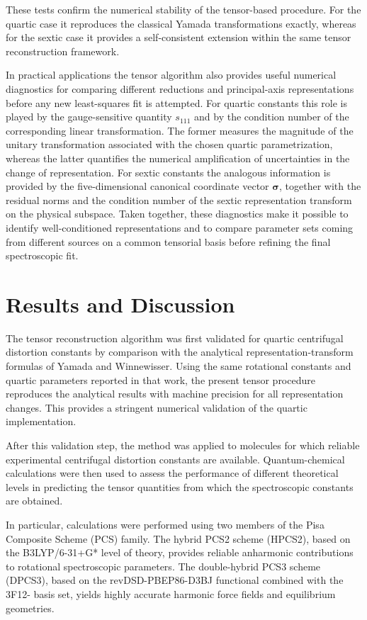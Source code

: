 These tests confirm the numerical stability of the tensor-based procedure.
For the quartic case it reproduces the classical Yamada transformations exactly,
whereas for the sextic case it provides a self-consistent extension within the
same tensor reconstruction framework.

In practical applications the tensor algorithm also provides useful numerical
diagnostics for comparing different reductions and principal-axis
representations before any new least-squares fit is attempted.  For quartic
constants this role is played by the gauge-sensitive quantity $s_{111}$ and by
the condition number of the corresponding linear transformation.  The former
measures the magnitude of the unitary transformation associated with the chosen
quartic parametrization, whereas the latter quantifies the numerical
amplification of uncertainties in the change of representation.  For sextic
constants the analogous information is provided by the five-dimensional
canonical coordinate vector $\boldsymbol\sigma$, together with the residual
norms and the condition number of the sextic representation transform on the
physical subspace.  Taken together, these diagnostics make it possible to
identify well-conditioned representations and to compare parameter sets coming
from different sources on a common tensorial basis before refining the final
spectroscopic fit.

\section{Results and Discussion}

The tensor reconstruction algorithm was first validated for quartic centrifugal
distortion constants by comparison with the analytical
representation-transform formulas of Yamada and
Winnewisser.\cite{Yamada1976} Using the same rotational constants and quartic
parameters reported in that work, the present tensor procedure reproduces the
analytical results with machine precision for all representation changes.  This
provides a stringent numerical validation of the quartic implementation.

After this validation step, the method was applied to molecules for which
reliable experimental centrifugal distortion constants are available.
Quantum-chemical calculations were then used to assess the performance of
different theoretical levels in predicting the tensor quantities from which the
spectroscopic constants are obtained.

In particular, calculations were performed using two members of the Pisa
Composite Scheme (PCS) family.  The hybrid PCS2 scheme (HPCS2), based on the
B3LYP/6-31+G* level of theory, provides reliable anharmonic contributions to
rotational spectroscopic parameters.  The double-hybrid PCS3 scheme (DPCS3),
based on the revDSD-PBEP86-D3BJ functional combined with the 3F12- basis set,
yields highly accurate harmonic force fields and equilibrium geometries.

